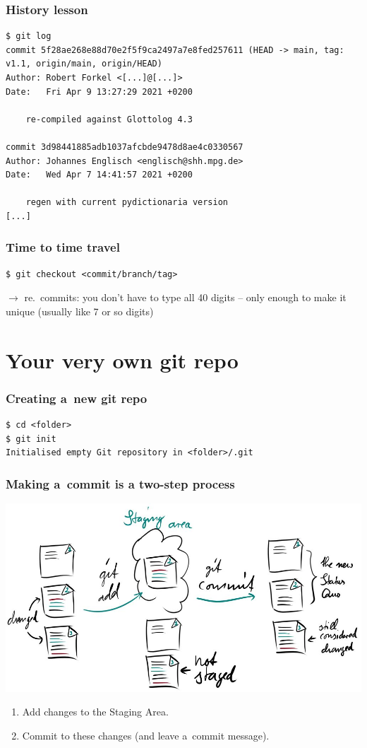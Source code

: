 \documentclass[12pt]{beamer}
\begin{document}
\begin{frame}[fragile]
  \frametitle{History lesson}

  {\footnotesize{}%
    \begin{verbatim}
$ git log
commit 5f28ae268e88d70e2f5f9ca2497a7e8fed257611 (HEAD -> main, tag: v1.1, origin/main, origin/HEAD)
Author: Robert Forkel <[...]@[...]>
Date:   Fri Apr 9 13:27:29 2021 +0200

    re-compiled against Glottolog 4.3

commit 3d98441885adb1037afcbde9478d8ae4c0330567
Author: Johannes Englisch <englisch@shh.mpg.de>
Date:   Wed Apr 7 14:41:57 2021 +0200

    regen with current pydictionaria version
[...]
    \end{verbatim}%
  }
\end{frame}

\begin{frame}[fragile]
  \frametitle{Time to time travel}

  {\footnotesize{}%
    \begin{verbatim}
$ git checkout <commit/branch/tag>
    \end{verbatim}
  }
  $\to$ re.\ commits: you don't have to type all 40 digits -- only enough
  to make it unique (usually like 7 or so digits)
\end{frame}


\section{Your very own git repo}

\begin{frame}[fragile]
  \frametitle{Creating a~new git repo}

  {\footnotesize{}%
    \begin{verbatim}
$ cd <folder>
$ git init
Initialised empty Git repository in <folder>/.git
    \end{verbatim}%
  }
\end{frame}

\begin{frame}
  \frametitle{Making a~commit is a two-step process}

  \begin{center}
    \includegraphics[width=.75\textwidth]{images/staging.jpg}%
  \end{center}
  \begin{enumerate}
    \item\alert{Add} changes to the Staging Area.
    \item\alert{Commit} to these changes (and leave a~commit message).
  \end{enumerate}
\end{frame}
\end{document}
